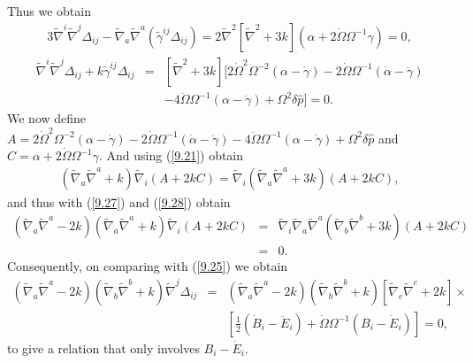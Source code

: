 %
Thus we obtain
%
\begin{eqnarray}
3\tilde\nabla^i\tilde\nabla^j\Delta_{ij}-\tilde\nabla_a\tilde\nabla^a(\tilde{\gamma}^{ij}\Delta_{ij})
=2\tilde{\nabla}^2[\tilde{\nabla}^2+3k](\alpha+2\dot{\Omega}\Omega^{-1}\gamma)=0,
\label{9.27}
\end{eqnarray}
%
%
\begin{eqnarray}
\tilde\nabla^i\tilde\nabla^j\Delta_{ij}+k\tilde{\gamma}^{ij}\Delta_{ij}
&=&[\tilde{\nabla}^2+3k][2 \dot{\Omega}^2 \Omega^{-2}(\alpha-\dot\gamma)
-2  \dot{\Omega} \Omega^{-1}(\dot\alpha -\ddot\gamma)
\nonumber\\
&&-4\ddot\Omega\Omega^{-1}(\alpha-\dot\gamma)+ \Omega^2 \delta \hat{p}]=0.
\label{9.28}
\end{eqnarray}
%
We now define $A=2 \dot{\Omega}^2 \Omega^{-2}(\alpha-\dot\gamma)-2  \dot{\Omega} \Omega^{-1}(\dot\alpha -\ddot\gamma)-4\ddot\Omega\Omega^{-1}(\alpha-\dot\gamma)+ \Omega^2 \delta \hat{p}$ and $C=\alpha+2\dot{\Omega}\Omega^{-1}\gamma$. And using (\ref{9.21}) obtain
%
\begin{eqnarray}
(\tilde{\nabla}_a\tilde{\nabla}^a+k)\tilde{\nabla}_i(A+2kC)=\tilde{\nabla}_i(\tilde{\nabla}_a\tilde{\nabla}^a+3k)(A+2kC),
\label{9.29}
\end{eqnarray}
%
and thus with  (\ref{9.27}) and (\ref{9.28}) obtain
%
\begin{eqnarray}
(\tilde{\nabla}_a\tilde{\nabla}^a-2k)(\tilde{\nabla}_a\tilde{\nabla}^a+k)\tilde{\nabla}_i(A+2kC)&=&
\tilde{\nabla}_i\tilde{\nabla}_a\tilde{\nabla}^a(\tilde{\nabla}_b\tilde{\nabla}^b+3k)(A+2kC)
\nonumber\\
&=&0.
\label{9.30}
\end{eqnarray}
%
Consequently, on comparing with (\ref{9.25})  we obtain
%
\begin{eqnarray}
(\tilde{\nabla}_a\tilde{\nabla}^a-2k)(\tilde{\nabla}_b\tilde{\nabla}^b+k)\tilde\nabla^j\Delta_{ij}&=&
(\tilde{\nabla}_a\tilde{\nabla}^a-2k)(\tilde{\nabla}_b\tilde{\nabla}^b+k)[\tilde{\nabla}_{c}\tilde{\nabla}^{c}+2k]\times
\nonumber\\
&&[\tfrac{1}{2}(\dot{B}_i-\ddot{E}_i)+\dot{\Omega}\Omega^{-1}(B_i-\dot{E}_i)]=0,
\label{9.31}
\end{eqnarray}
%
to give a relation that only involves $B_i-\dot{E}_{i}$.

